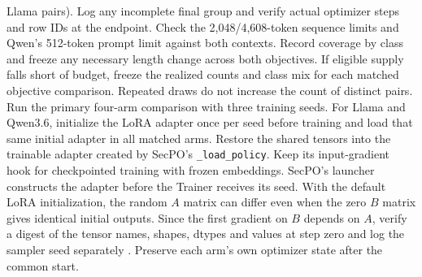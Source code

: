 \documentclass[11pt]{article}
\begin{document}
Llama pairs). Log any incomplete final group and verify actual optimizer steps and row IDs at the endpoint. Check the 2,048/4,608-token sequence limits and Qwen's 512-token prompt limit against both contexts. Record coverage by class and freeze any necessary length change across both objectives. If eligible supply falls short of budget, freeze the realized counts and class mix for each matched objective comparison. Repeated draws do not increase the count of distinct pairs. Run the primary four-arm comparison with three training seeds. For Llama and Qwen3.6, initialize the LoRA adapter once per seed before training and load that same initial adapter in all matched arms. Restore the shared tensors into the trainable adapter created by SecPO’s \texttt{\_load\_policy}. Keep its input-gradient hook for checkpointed training with frozen embeddings. SecPO's launcher constructs the adapter before the Trainer receives its seed. With the default LoRA initialization, the random $A$ matrix can differ even when the zero $B$ matrix gives identical initial outputs. Since the first gradient on $B$ depends on $A$, verify a digest of the tensor names, shapes, dtypes and values at step zero and log the sampler seed separately \cite{secpocode}. Preserve each arm's own optimizer state after the common start.
\end{document}
